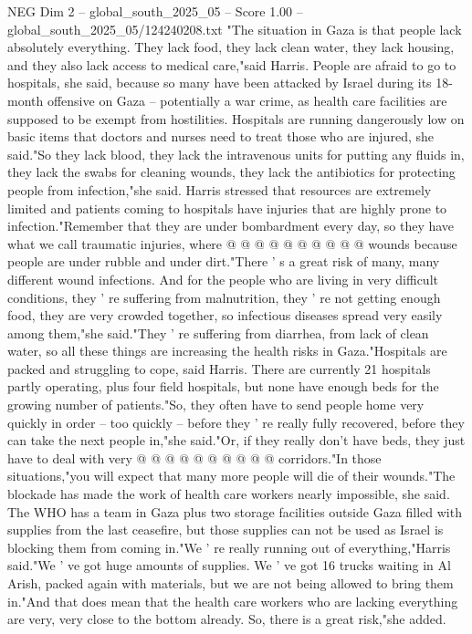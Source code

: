 \begin{textsample}{NEG Dim 2 – global\_south\_2025\_05 – Score 1.00 – global\_south\_2025\_05/124240208.txt}  \label{ex:f2_neg_144}
"The situation in Gaza is that people lack absolutely everything.
They lack food, they lack clean water, they lack housing, and they also lack access to medical care,"said Harris.
People are afraid to go to hospitals, she said, because so many have been attacked by Israel during its 18-month offensive on Gaza -- potentially a war crime, as health care facilities are supposed to be exempt from hostilities.
Hospitals are running dangerously low on basic items that doctors and nurses need to treat those who are injured, she said."So they lack blood, they lack the intravenous units for putting any fluids in, they lack the swabs for cleaning wounds, they lack the antibiotics for protecting people from infection,"she said.
Harris stressed that resources are extremely limited and patients coming to hospitals have injuries that are highly prone to infection."Remember that they are under bombardment every day, so they have what we call traumatic injuries, where @ @ @ @ @ @ @ @ @ @ wounds because people are under rubble and under dirt."There ' s a great risk of many, many different wound infections.
And for the people who are living in very difficult conditions, they ' re suffering from malnutrition, they ' re not getting enough food, they are very crowded together, so infectious diseases spread very easily among them,"she said."They ' re suffering from diarrhea, from lack of clean water, so all these things are increasing the health risks in Gaza."Hospitals are packed and struggling to cope, said Harris.
There are currently 21 hospitals partly operating, plus four field hospitals, but none have enough beds for the growing number of patients."So, they often have to send people home very quickly in order -- too quickly -- before they ' re really fully recovered, before they can take the next people in,"she said."Or, if they really don't have beds, they just have to deal with very @ @ @ @ @ @ @ @ @ @ corridors."In those situations,"you will expect that many more people will die of their wounds."The blockade has made the work of health care workers nearly impossible, she said.
The WHO has a team in Gaza plus two storage facilities outside Gaza filled with supplies from the last ceasefire, but those supplies can not be used as Israel is blocking them from coming in."We ' re really running out of everything,"Harris said."We ' ve got huge amounts of supplies.
We ' ve got 16 trucks waiting in Al Arish, packed again with materials, but we are not being allowed to bring them in."And that does mean that the health care workers who are lacking everything are very, very close to the bottom already.
So, there is a great risk,"she added.

\end{textsample}
